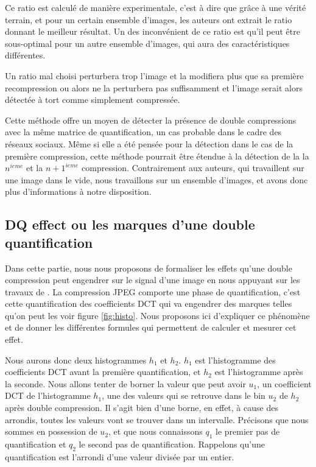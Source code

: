\documentclass[utf8,final]{stageM2R} %
\begin{document}
Ce ratio est calculé de manière experimentale, c'est à dire que grâce à une vérité terrain, et pour un certain ensemble d'images, les auteurs ont extrait le ratio donnant le meilleur résultat. Un des inconvénient de ce ratio est qu'il peut être sous-optimal pour un autre ensemble d'images, qui aura des caractéristiques différentes.

Un ratio mal choisi perturbera trop l'image et la modifiera plus que sa première recompression ou alors ne la perturbera pas suffisamment et l'image serait alors détectée à tort comme simplement compressée.

Cette méthode offre un moyen de détecter la présence de double compressions avec la même matrice de quantification, un cas probable dans le cadre des réseaux sociaux. Même si elle a été pensée pour la détection dans le cas de la première compression, cette méthode pourrait être étendue à la détection de la la $n^{ieme}$ et la $n+1^{ieme}$ compression. Contrairement aux auteurs, qui travaillent sur une image dans le vide, nous travaillons sur un ensemble d'images, et avons donc plus d'informations à notre disposition.

\subsection{DQ effect ou les marques d'une double quantification}
Dans cette partie, nous nous proposons de formaliser les effets qu'une double compression peut engendrer sur le signal d'une image en nous appuyant sur les travaux de \autocite{lin2009fast}. La compression JPEG comporte une phase de quantification, c'est cette quantification des coefficients DCT qui va engendrer des marques telles qu'on peut les voir figure \ref{fig:histo}. Nous proposons ici d'expliquer ce phénomène et de donner les différentes formules qui permettent de calculer et mesurer cet effet.

Nous aurons donc deux histogrammes $h_1$ et $h_2$. $h_1$ est l'histogramme des coefficients DCT avant la première quantification, et $h_2$ est l'histogramme après la seconde. Nous allons tenter de borner la valeur que peut avoir $u_1$, un coefficient DCT de l'histogramme $h_1$, une des valeurs qui se retrouve dans le bin $u_2$ de $h_2$ après double compression. Il s'agit bien d'une borne, en effet, à cause des arrondis, toutes les valeurs vont se trouver dans un intervalle. Précisons que nous sommes en possession de $u_2$, et que nous connaissons $q_1$ le premier pas de quantification et $q_2$ le second pas de quantification. Rappelons qu'une quantification est l'arrondi d'une valeur divisée par un entier.
\end{document}
